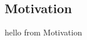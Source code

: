 \documentclass[.../Dokumentation.tex]{subfiles}
\begin{document}
    \subsection{Motivation}\label{sec-intr-motivation}
    hello from Motivation
\end{document}
